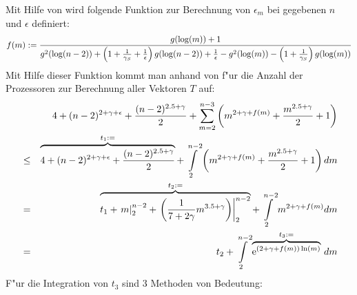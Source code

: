 Mit Hilfe von  wird folgende Funktion zur 
Berechnung von $\epsilon_m$ bei gegebenen $n$ und $\epsilon$ definiert:
\[ f(m):=
   \frac{
       g(\log(m))+ 1
   }{
       g^2(\log(n-2))
       + \left( 1 + \frac{1}{\gamma_S} 
               + \frac{1}{\epsilon} 
         \right) g(\log(n-2))
       + \frac{1}{\epsilon} -
       g^2(\log(m))-
       \left( 1 + \frac{1}{\gamma_S} \right) g(\log(m))
   }
\]
Mit Hilfe dieser Funktion kommt man anhand von 
f"ur die Anzahl der Prozessoren zur Berechnung aller Vektoren $T$ auf:
\begin{eqnarray}
\nonumber
   & & 
   4 + (n-2)^{2+\gamma+\epsilon} + \frac{ (n-2)^{2.5+\gamma} }{ 2 } +
   \sum_{m=2}^{n-3}
       \left( m^{2+\gamma+f(m)} + \frac{ m^{2.5+\gamma} }{ 2 } + 1
       \right)
\\ 
\nonumber
   & \leq & 
   \overbrace{
       4 + (n-2)^{2+\gamma+\epsilon} + \frac{ (n-2)^{2.5+\gamma} }{ 2 }
   }^{t_1:=}
       +
   \int\limits_{2}^{n-2}
       \left( m^{2+\gamma+f(m)} + \frac{ m^{2.5+\gamma} }{ 2 } + 1
       \right) dm
\\ 
   & = &
       \overbrace{ 
           t_1 + \left. m \right|_2^{n-2} +
           \left. \left(
               \frac{1}{7+2\gamma} m^{3.5+\gamma}
           \right) \right|_2^{n-2} 
       }^{t_2:=}
       +
       \int\limits_2^{n-2}
           m^{2+\gamma+f(m)} dm
\\
\label{EquBerkProzInt2}
   & = & t_2 +
       \int\limits_2^{n-2}
       \overbrace{
           \mbox{\rm e}^{(2+\gamma+f(m))\ln(m)}
       }^{t_3:=} \, dm
\end{eqnarray}
F"ur die Integration von $t_3$ sind 3 Methoden von Bedeutung:
